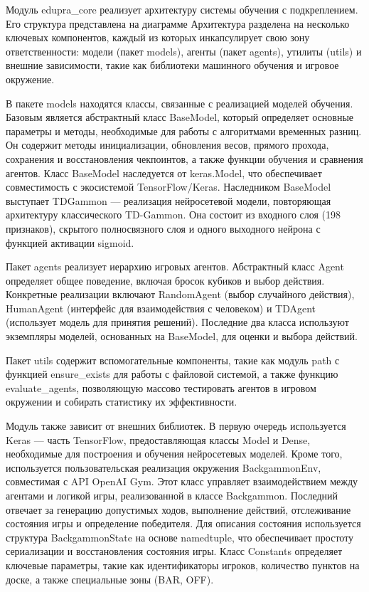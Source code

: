 Модуль edupra\_core реализует архитектуру системы обучения с подкреплением. Его структура представлена на диаграмме  Архитектура разделена на несколько ключевых компонентов, каждый из которых инкапсулирует свою зону ответственности: модели (пакет models), агенты (пакет agents), утилиты (utils) и внешние зависимости, такие как библиотеки машинного обучения и игровое окружение.


В пакете models находятся классы, связанные с реализацией моделей обучения. Базовым является абстрактный класс BaseModel, который определяет основные параметры и методы, необходимые для работы с алгоритмами временных разниц. Он содержит методы инициализации, обновления весов, прямого прохода, сохранения и восстановления чекпоинтов, а также функции обучения и сравнения агентов. Класс BaseModel наследуется от keras.Model, что обеспечивает совместимость с экосистемой TensorFlow/Keras. Наследником BaseModel выступает TDGammon --- реализация нейросетевой модели, повторяющая архитектуру классического TD-Gammon. Она состоит из входного слоя (198 признаков), скрытого полносвязного слоя и одного выходного нейрона с функцией активации sigmoid.

Пакет agents реализует иерархию игровых агентов. Абстрактный класс Agent определяет общее поведение, включая бросок кубиков и выбор действия. Конкретные реализации включают RandomAgent (выбор случайного действия), HumanAgent (интерфейс для взаимодействия с человеком) и TDAgent (использует модель для принятия решений). Последние два класса используют экземпляры моделей, основанных на BaseModel, для оценки и выбора действий.

Пакет utils содержит вспомогательные компоненты, такие как модуль path с функцией ensure\_exists для работы с файловой системой, а также функцию evaluate\_agents, позволяющую массово тестировать агентов в игровом окружении и собирать статистику их эффективности.

Модуль также зависит от внешних библиотек. В первую очередь используется Keras --- часть TensorFlow, предоставляющая классы Model и Dense, необходимые для построения и обучения нейросетевых моделей. Кроме того, используется пользовательская реализация окружения BackgammonEnv, совместимая с API OpenAI Gym. Этот класс управляет взаимодействием между агентами и логикой игры, реализованной в классе Backgammon. Последний отвечает за генерацию допустимых ходов, выполнение действий, отслеживание состояния игры и определение победителя. Для описания состояния используется структура BackgammonState на основе namedtuple, что обеспечивает простоту сериализации и восстановления состояния игры. Класс Constants определяет ключевые параметры, такие как идентификаторы игроков, количество пунктов на доске, а также специальные зоны (BAR, OFF).
